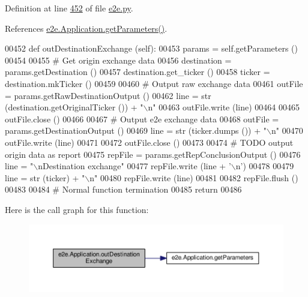 Definition at line \hyperlink{e2e_8py_source_l00452}{452} of file \hyperlink{e2e_8py_source}{e2e.\+py}.



References \hyperlink{e2e_8py_source_l00386}{e2e.\+Application.\+get\+Parameters()}.


\begin{DoxyCode}
00452     \textcolor{keyword}{def }outDestinationExchange (self):
00453         params = self.getParameters ()
00454         
00455         \textcolor{comment}{# Get origin exchange data}
00456         destination = params.getDestination ()
00457         destination.get\_ticker ()
00458         ticker = destination.mkTicker ()
00459 
00460         \textcolor{comment}{# Output raw exchange data}
00461         outFile = params.getRawDestinationOutput ()
00462         line = str (destination.getOriginalTicker ()) + \textcolor{stringliteral}{"\(\backslash\)n"}
00463         outFile.write (line)
00464         
00465         outFile.close ()
00466     
00467         \textcolor{comment}{# Output e2e exchange data}
00468         outFile = params.getDestinationOutput ()
00469         line = str (ticker.dumps ()) + \textcolor{stringliteral}{"\(\backslash\)n"}
00470         outFile.write (line)
00471         
00472         outFile.close ()
00473         
00474         \textcolor{comment}{# TODO output origin data as report}
00475         repFile = params.getRepConclusionOutput ()
00476         line = \textcolor{stringliteral}{"\(\backslash\)nDestination exchange"}
00477         repFile.write (line + \textcolor{stringliteral}{'\(\backslash\)n'})
00478         
00479         line = str (ticker) + \textcolor{stringliteral}{"\(\backslash\)n"}
00480         repFile.write (line)
00481         
00482         repFile.flush ()
00483     
00484         \textcolor{comment}{# Normal function termination }
00485         \textcolor{keywordflow}{return} 
00486     
\end{DoxyCode}
Here is the call graph for this function\+:
\nopagebreak
\begin{figure}[H]
\begin{center}
\leavevmode
\includegraphics[width=350pt]{classe2e_1_1_application_a1b099bee6f8170c4c52e7ae884d95b27_cgraph}
\end{center}
\end{figure}
\mbox{\label{classe2e_1_1_application_a3e33fd00d85637393d48ea3f7dbd95c7}} 
